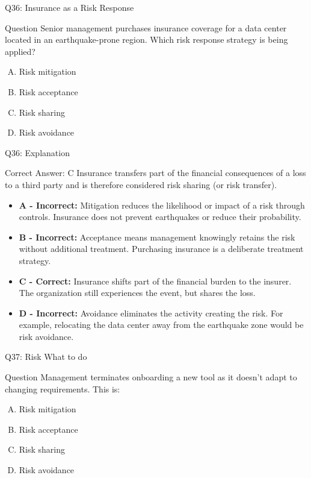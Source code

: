 \documentclass{beamer}
\begin{document}
	
	\begin{frame}{Q36: Insurance as a Risk Response} \begin{block}{Question} Senior management purchases insurance coverage for a data center located in an earthquake-prone region. Which risk response strategy is being applied? \end{block} \begin{enumerate}[(A)] \item Risk mitigation \item Risk acceptance \item Risk sharing \item Risk avoidance \end{enumerate} \end{frame} \begin{frame}{Q36: Explanation} \begin{block}{Correct Answer: C} Insurance transfers part of the financial consequences of a loss to a third party and is therefore considered risk sharing (or risk transfer). \end{block} \begin{itemize} \item \textbf{A - Incorrect:} Mitigation reduces the likelihood or impact of a risk through controls. Insurance does not prevent earthquakes or reduce their probability. \item \textbf{B - Incorrect:} Acceptance means management knowingly retains the risk without additional treatment. Purchasing insurance is a deliberate treatment strategy. \item \textbf{C - Correct:} Insurance shifts part of the financial burden to the insurer. The organization still experiences the event, but shares the loss. \item \textbf{D - Incorrect:} Avoidance eliminates the activity creating the risk. For example, relocating the data center away from the earthquake zone would be risk avoidance. \end{itemize} \end{frame}
	
	\begin{frame}{Q37: Risk What to do}
		\begin{block}{Question}
			Management terminates onboarding a new tool as it doesn't adapt to changing requirements. This is:
		\end{block}
		\begin{enumerate}[(A)]
			\item Risk mitigation
			\item Risk acceptance
			\item Risk sharing
			\item Risk avoidance
		\end{enumerate}
	\end{frame}
	
\end{document}
